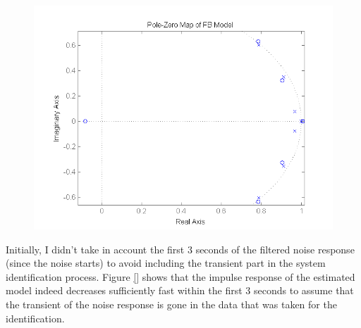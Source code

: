 \begin{figure}[h]
\centering
\includegraphics[width=1.0\textwidth]{pics/pole_FB}
\caption{}
\label{pic:}
\end{figure}

Initially, I didn't take in account the first 3 seconds of the filtered noise response (since the noise starts) to avoid including the transient part in the system identification process. Figure \ref{} shows that the impulse response of the estimated model indeed decreases sufficiently fast within the first 3 seconds to assume that the transient of the noise response is gone in the data that was taken for the identification.

